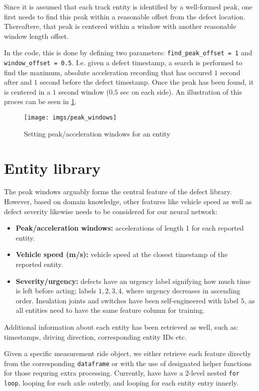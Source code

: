Since it is assumed that each track entity is identified by a well-formed peak, one first needs to find this peak within a reasonable offset from the defect location. Thereaftere, that peak is centered within a window with another reasonable window length offset.

In the code, this is done by defining two parameters: \verb|find_peak_offset = 1| and \verb|window_offset = 0.5|. I.e. given a defect timestamp, a search is performed to find the maximum, absolute acceleration recording that has occured $1$ second after and $1$ second before the defect timestamp. Once the peak has been found, it is centered in a $1$ second window ($0.5$ sec on each side). An illustration of this proces can be seen in \ref{fig:peak_windows}.

\begin{figure}[H]
	\centering
	\texttt{[image: imgs/peak\_windows]}
	\caption{Setting peak/acceleration windows for an entity}
	\label{fig:peak_windows}
\end{figure}

\section{Entity library}
The peak windows arguably forms the central feature of the defect library. However, based on domain knowledge, other features like vehicle speed as well as defect severity likewise needs to be considered for our neural network:

\begin{itemize}
	\item \textbf{Peak/acceleration windows:} accelerations of length 1 for each reported entity.
	\item \textbf{Vehicle speed (m/s):} vehicle speed at the closest timestamp of the reported entity.
	\item \textbf{Severity/urgency:} defects have an urgency label signifying how much time is left before acting; labels $1,2,3,4$, where urgency decreases in ascending order. Insulation joints and switches have been self-engineered with label $5$, as all entities need to have the same feature column for training.
\end{itemize}
Additional information about each entity has been retrieved as well, such as: timestamps, driving direction, corresponding entity IDs etc. 

Given a specific measurement ride object, we either retrieve each feature directly from the corresponding \verb|dataframe| or with the use of designated helper functions for those requring extra processing. Currently, have have a 2-level nested \verb|for loop|, looping for each axle outerly, and looping for each entity entry innerly.

